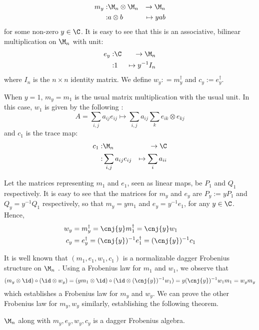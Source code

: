 
\begin{eqnarray*}
  m_y :& \M_n \otimes \M_n &\to     \M_n \\
      :&  a   \otimes b    &\mapsto yab
\end{eqnarray*}
for some non-zero $y \in \C$. It is easy to see that this is an associative,
bilinear multiplication on $\M_n$ with unit:
\begin{eqnarray*}
  e_y :& \C &\to     \M_n \\
    :&  1 &\mapsto y^{-1}I_n
\end{eqnarray*}
where $I_n$ is the $n \times n$ identity matrix. We define
$w_y : = m_y^{\dagger}$ and $c _y := e_y^{\dagger}$.

When $y = 1$, $m_y = m_1$ is the usual matrix multiplication with the usual
unit. In this case, $w_1$ is given by the following \cite[8]{CatQChan}:
\[
  A = \sum_{i, j} a_{ij}e_{ij}
    \mapsto \sum_{i, j} a_{ij} \sum_{k} e_{ik} \otimes e_{kj}
\]
and $c_1$ is the trace map:
\begin{eqnarray*}
  c_1 :& \M_n &\to     \C \\
      :& \sum_{i, j} a_{ij}e_{ij} &\mapsto \sum_{i} a_{ii}
\end{eqnarray*}

Let the matrices representing $m_1$ and $e_1$, seen as linear maps, be $P_1$ and
$Q_1$ respectively. It is easy to see that the matrices for $m_y$ and $e_y$ are
$P_y := yP_1$ and $Q_y = y^{-1}Q_1$ respectively, so that $m_y = ym_1$ and
$e_y = y^{-1}e_1$, for any $y \in \C$. Hence,
\begin{align*}
  w_y &= m_y^{\dagger} = \cnj{y}m_1^{\dagger} = \cnj{y}w_1 \\
  c_y &= e_y^{\dagger} = (\cnj{y})^{-1}e_1^{\dagger} = (\cnj{y})^{-1}c_1
\end{align*}

It is well known that $(m_1, e_1, w_1, c_1)$ is a normalizable dagger Frobenius
structure on $\M_n$ \cite[8, 10]{CatQChan}. Using a Frobenius law for $m_1$
and $w_1$, we observe that
\[
  (m_y \otimes \id) \circ (\id \otimes w_y)
  = (ym_1 \otimes \id) \circ (\id \otimes (\cnj{y})^{-1}w_1)
  = y(\cnj{y})^{-1}w_1m_1
  = w_ym_y
\]
which establishes a Frobenius law for $m_y$ and $w_y$. We can prove the other
Frobenius law for $m_y, w_y$ similarly, establishing the following theorem.

\begin{thm}
$\M_n$ along with $m_y, e_y, w_y, c_y$ is a dagger Frobenius algebra.
\end{thm}

